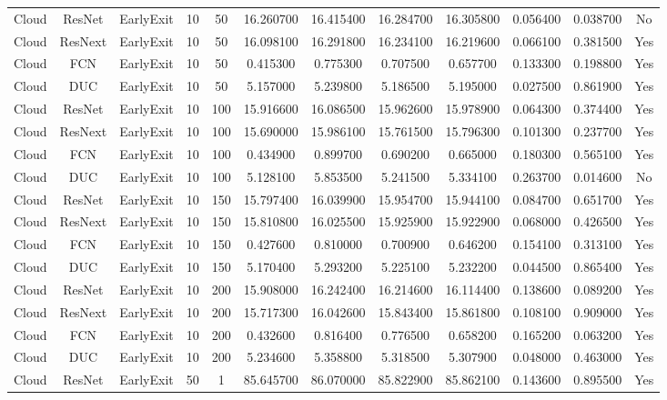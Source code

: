 \begin{tabular}{|c||c||c||c||c||c||c||c||c||c||c||c|}
Cloud & ResNet & EarlyExit & 10 & 50 & 16.260700 & 16.415400 & 16.284700 & 16.305800 & 0.056400 & 0.038700 & No \\
Cloud & ResNext & EarlyExit & 10 & 50 & 16.098100 & 16.291800 & 16.234100 & 16.219600 & 0.066100 & 0.381500 & Yes \\
Cloud & FCN & EarlyExit & 10 & 50 & 0.415300 & 0.775300 & 0.707500 & 0.657700 & 0.133300 & 0.198800 & Yes \\
Cloud & DUC & EarlyExit & 10 & 50 & 5.157000 & 5.239800 & 5.186500 & 5.195000 & 0.027500 & 0.861900 & Yes \\
Cloud & ResNet & EarlyExit & 10 & 100 & 15.916600 & 16.086500 & 15.962600 & 15.978900 & 0.064300 & 0.374400 & Yes \\
Cloud & ResNext & EarlyExit & 10 & 100 & 15.690000 & 15.986100 & 15.761500 & 15.796300 & 0.101300 & 0.237700 & Yes \\
Cloud & FCN & EarlyExit & 10 & 100 & 0.434900 & 0.899700 & 0.690200 & 0.665000 & 0.180300 & 0.565100 & Yes \\
Cloud & DUC & EarlyExit & 10 & 100 & 5.128100 & 5.853500 & 5.241500 & 5.334100 & 0.263700 & 0.014600 & No \\
Cloud & ResNet & EarlyExit & 10 & 150 & 15.797400 & 16.039900 & 15.954700 & 15.944100 & 0.084700 & 0.651700 & Yes \\
Cloud & ResNext & EarlyExit & 10 & 150 & 15.810800 & 16.025500 & 15.925900 & 15.922900 & 0.068000 & 0.426500 & Yes \\
Cloud & FCN & EarlyExit & 10 & 150 & 0.427600 & 0.810000 & 0.700900 & 0.646200 & 0.154100 & 0.313100 & Yes \\
Cloud & DUC & EarlyExit & 10 & 150 & 5.170400 & 5.293200 & 5.225100 & 5.232200 & 0.044500 & 0.865400 & Yes \\
Cloud & ResNet & EarlyExit & 10 & 200 & 15.908000 & 16.242400 & 16.214600 & 16.114400 & 0.138600 & 0.089200 & Yes \\
Cloud & ResNext & EarlyExit & 10 & 200 & 15.717300 & 16.042600 & 15.843400 & 15.861800 & 0.108100 & 0.909000 & Yes \\
Cloud & FCN & EarlyExit & 10 & 200 & 0.432600 & 0.816400 & 0.776500 & 0.658200 & 0.165200 & 0.063200 & Yes \\
Cloud & DUC & EarlyExit & 10 & 200 & 5.234600 & 5.358800 & 5.318500 & 5.307900 & 0.048000 & 0.463000 & Yes \\
Cloud & ResNet & EarlyExit & 50 & 1 & 85.645700 & 86.070000 & 85.822900 & 85.862100 & 0.143600 & 0.895500 & Yes \\

\end{tabular}

